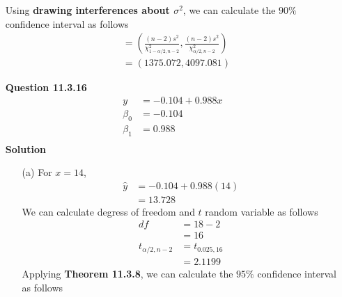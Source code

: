 \documentclass{uofa-eng-assignment}
\begin{document}
\begin{enumerate}
        Using \textbf{drawing interferences about $\sigma^2$}, we can calculate the $90\%$ confidence interval as follows
        \begin{align*}
             & = \left(\frac{(n-2)s^2}{\chi^2_{1-\alpha/2, n-2}}, \frac{(n-2)s^2}{\chi^2_{\alpha/2, n-2}}\right) \\
             & = (1375.072, 4097.081)
        \end{align*}
    \item[]
        \textbf{Question 11.3.16}
        \begin{align*}
            y       & = -0.104 + 0.988x \\
            \beta_0 & = -0.104          \\
            \beta_1 & = 0.988           \\
        \end{align*}
        \textbf{Solution}
        \begin{itemize}
            \item [(a)]
                  For $x = 14$,
                  \begin{align*}
                      \hat{y} & = -0.104 + 0.988(14) \\
                              & = 13.728
                  \end{align*}
                  We  can calculate degress of freedom and $t$ random variable as follows
                  \begin{align*}
                      df                & = 18 - 2        \\
                                        & = 16            \\
                      t_{\alpha/2, n-2} & = t_{0.025, 16} \\
                                        & = 2.1199
                  \end{align*}
                  Applying \textbf{Theorem 11.3.8}, we can calculate the $95\%$ confidence interval as follows

\end{itemize}
\end{enumerate}
\end{document}
